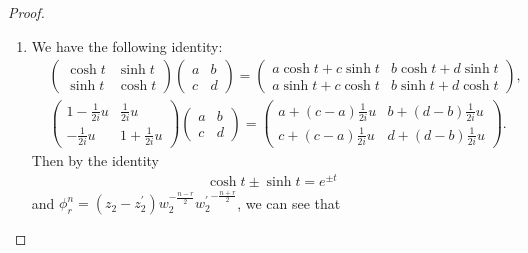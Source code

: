 \documentclass[11pt, a4paper]{amsart}
\theoremstyle{plain}
\theoremstyle{definition}
\numberwithin{equation}{section}
\begin{document}
\begin{proof}
    \begin{enumerate}
        \item We have the following identity:
            \begin{align*}
                &\begin{pmatrix}
                    \cosh t & \sinh t \\
                    \sinh t & \cosh t 
                \end{pmatrix} \begin{pmatrix}
                                a & b \\
                                c & d 
                             \end{pmatrix} = \begin{pmatrix}
                                                a \cosh t + c \sinh t & b \cosh t + d\sinh t \\
                                                a \sinh t + c \cosh t & b \sinh t + d \cosh t
                                            \end{pmatrix}, \\
                &\begin{pmatrix}
                     1 - \frac{1}{2i}u & \frac{1}{2i}u \\
                     -\frac{1}{2i}u & 1 + \frac{1}{2i}u 
                 \end{pmatrix} \begin{pmatrix}
                                    a & b \\
                                    c & d 
                               \end{pmatrix} = \begin{pmatrix}
                                                    a + (c - a) \frac{1}{2i}u &  b + (d - b) \frac{1}{2i}u\\
                                                    c + (c - a) \frac{1}{2i}u &  d + (d - b) \frac{1}{2i}u
                                                \end{pmatrix}. 
            \end{align*}
            Then by the identity 
            \begin{align*}
               \cosh t \pm \sinh t = e^{\pm t}
            \end{align*}
            and $\phi_{r}^{n} = (z_2 - z_2^{\prime}) w_{2}^{-\frac{n - r}{2}} {w_{2}^{\prime}}^{-\frac{n + r}{2}}$, we can see that 

\end{enumerate}
\end{proof}
\end{document}
